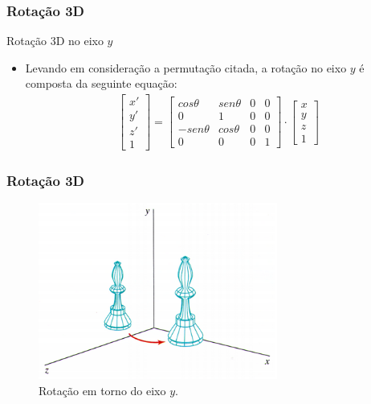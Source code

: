 \documentclass{beamer}
\begin{document}
\begin{frame}
\frametitle{Rotação 3D}

	\begin{block}{Rotação 3D no eixo $y$}
		\begin{itemize}
			\item Levando em consideração a permutação citada, a rotação no eixo $y$ é composta da seguinte equação:\\
			\begin{eqnarray*}
				\begin{bmatrix}
					x' \\
					y' \\
					z' \\
					1
				\end{bmatrix} = 
				\begin{bmatrix}
					cos \theta	& sen \theta		& 0 & 0 \\
					0			& 1				& 0 & 0 \\
					-sen \theta	& cos \theta	& 0 & 0 \\
					0			& 0				& 0	& 1
				\end{bmatrix}
				\cdot \begin{bmatrix}
					x \\
					y \\
					z \\
					1
				\end{bmatrix}
			\end{eqnarray*}
		\end{itemize}
	\end{block}
	
\end{frame}

\begin{frame}
\frametitle{Rotação 3D}


	\begin{figure}[!h]
			\begin{center}
			\includegraphics[width=0.7\textwidth]{Figures/ry}
			\caption{Rotação em torno do eixo $y$.}
			\end{center}
	\end{figure}
	
\end{frame}
\end{document}

